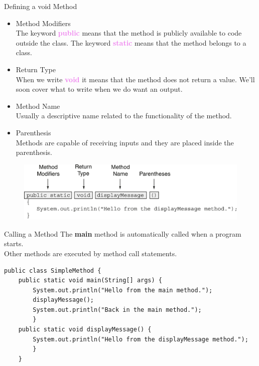 \documentclass[11pt]{beamer}
\newcommand{\violet}[1]{\textcolor{violet}{#1}}
\begin{document}
\begin{frame}{Defining a void Method}
\footnotesize
\begin{itemize}
    \item Method Modifiers \\
    The keyword \violet{\textbf{public}} means that the method is publicly available to code outside the class. The keyword \violet{\textbf{static}} means that the method belongs to a class.
    \item Return Type \\ 
    When we write \violet{\textbf{void}} it means that the method does not return a value. We'll soon cover what to write when we do want an output.
    \item Method Name \\ 
    Usually a descriptive name related to the functionality of the method.
    \item Parenthesis \\ 
    Methods are capable of receiving inputs and they are placed inside the parenthesis.
\end{itemize}
    \noindent 
    \begin{figure}[H]
    \centering
    \includegraphics[scale=0.9]{Images/chapter05_methodDescription.png}
    \end{figure}    
\end{frame}

\begin{frame}[fragile]{Calling a Method}
    \vspace{1em} 
    The \textbf{main} method is automatically called when a program starts. \\ 
    \vspace{1em} 
    Other methods are executed by method call statements.
    \begin{lstlisting}
public class SimpleMethod { 
    public static void main(String[] args) {
        System.out.println("Hello from the main method.");
        displayMessage();
        System.out.println("Back in the main method.");
        }
    public static void displayMessage() {
        System.out.println("Hello from the displayMessage method."); 
        }
    }
    \end{lstlisting}
\end{frame}
\end{document}
